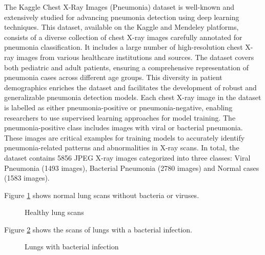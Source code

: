 \documentclass[9pt,twocolumn,twoside]{opticajnl}
\begin{document}
The Kaggle Chest X-Ray Images (Pneumonia) dataset is well-known and extensively studied for advancing pneumonia detection using deep learning techniques. This dataset, available on the Kaggle and Mendeley platforms, consists of a diverse collection of chest X-ray images carefully annotated for pneumonia classification. It includes a large number of high-resolution chest X-ray images from various healthcare institutions and sources. The dataset covers both pediatric and adult patients, ensuring a comprehensive representation of pneumonia cases across different age groups. This diversity in patient demographics enriches the dataset and facilitates the development of robust and generalizable pneumonia detection models. Each chest X-ray image in the dataset is labelled as either pneumonia-positive or pneumonia-negative, enabling researchers to use supervised learning approaches for model training. The pneumonia-positive class includes images with viral or bacterial pneumonia. These images are critical examples for training models to accurately identify pneumonia-related patterns and abnormalities in X-ray scans. In total, the dataset contains 5856  JPEG X-ray images categorized into three classes: Viral Pneumonia (1493 images), Bacterial Pneumonia (2780 images) and Normal cases (1583 images).

Figure \ref{fig:healthy-lung-scans} shows normal lung scans without bacteria or viruses.

\begin{figure}[ht]
\centering
{}
\caption{Healthy lung scans}
\label{fig:healthy-lung-scans}
\end{figure}

Figure \ref{fig:bacteria-lung-scans} shows the scans of lungs with a bacterial infection.

\begin{figure}[ht]
\centering
{}
\caption{Lungs with bacterial infection}
\label{fig:bacteria-lung-scans}
\end{figure}
\end{document}
